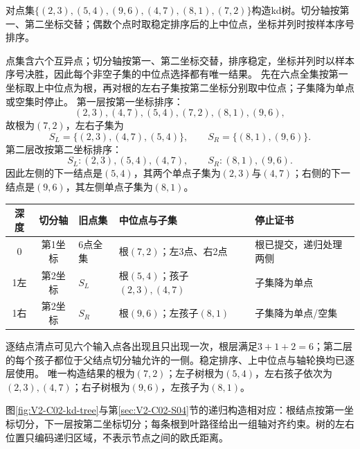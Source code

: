 \begin{example}[六点平衡kd树]\label{exm:V2-C02-kd-build}
对点集$\{(2,3),(5,4),(9,6),(4,7),(8,1),(7,2)\}$构造kd树。切分轴按第一、第二坐标交替；偶数个点时取稳定排序后的上中位点，坐标并列时按样本序号排序。
\end{example}
\begin{solution}
\SolGiven 点集含六个互异点；切分轴按第一、第二坐标交替，排序稳定，坐标并列时以样本序号决胜，因此每个非空子集的中位点选择都有唯一结果。
\SolPlan 先在六点全集按第一坐标取上中位点为根，再对根的左右子集按第二坐标分别取中位点；子集降为单点或空集时停止。
\SolDerive
第一层按第一坐标排序：
\[
(2,3),(4,7),(5,4),\boxed{(7,2)},(8,1),(9,6),
\]
故根为$(7,2)$，左右子集为
\[
S_L=\{(2,3),(4,7),(5,4)\},
\qquad
S_R=\{(8,1),(9,6)\}.
\]
第二层改按第二坐标排序：
\[
S_L:(2,3),\boxed{(5,4)},(4,7),
\qquad
S_R:(8,1),\boxed{(9,6)}.
\]
因此左侧的下一结点是$(5,4)$，其两个单点子集为$(2,3)$与$(4,7)$；右侧的下一结点是$(9,6)$，其左侧单点子集为$(8,1)$。
\begin{center}
\begin{tabularx}{\linewidth}{@{}c c X X X@{}}
\toprule
深度 & 切分轴 & 旧点集 & 中位点与子集 & 停止证书\\
\midrule
0 & 第1坐标 & 6点全集 & 根$(7,2)$；左3点、右2点 & 根已提交，递归处理两侧\\
1左 & 第2坐标 & $S_L$ & 根$(5,4)$；孩子$(2,3),(4,7)$ & 子集降为单点\\
1右 & 第2坐标 & $S_R$ & 根$(9,6)$；左孩子$(8,1)$ & 子集降为单点/空集\\
\bottomrule
\end{tabularx}
\end{center}
\SolCheck 逐结点清点可见六个输入点各出现且只出现一次，根层满足$3+1+2=6$；第二层的每个孩子都位于父结点切分轴允许的一侧。稳定排序、上中位点与轴轮换均已逐层使用。
\SolAnswer 唯一构造结果的根为$(7,2)$；左子树根为$(5,4)$，左右孩子依次为$(2,3),(4,7)$；右子树根为$(9,6)$，左孩子为$(8,1)$。
\end{solution}


图\ref{fig:V2-C02-kd-tree}与第\ref{sec:V2-C02-S04}节的递归构造相对应：根结点按第一坐标切分，下一层按第二坐标切分；每条根到叶路径给出一组轴对齐约束。树的左右位置只编码递归区域，不表示节点之间的欧氏距离。


